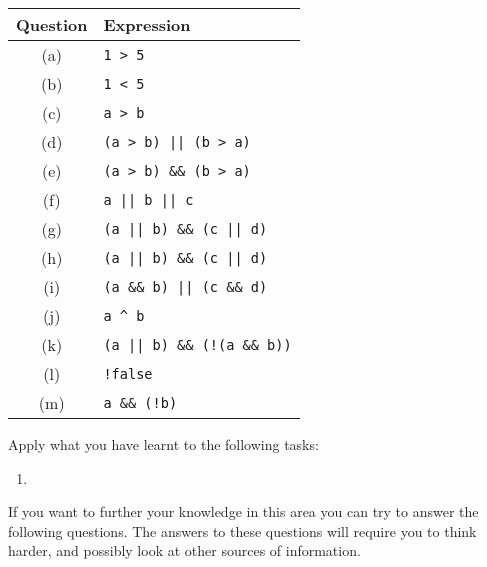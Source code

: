 \begin{enumerate}
{    \begin{tabular}{|c|l|}
      \hline
      \textbf{Question} & \textbf{Expression} \\
      \hline
      (a) & \texttt{1 > 5} \\
      \hline
      (b) & \texttt{1 < 5} \\
      \hline
      (c) & \texttt{a > b} \\
      \hline
      (d) & \texttt{(a > b) || (b > a)} \\
      \hline
      (e) & \texttt{(a > b) \&\& (b > a)} \\
      \hline
      (f) & \texttt{a || b || c} \\
      \hline
      (g) & \texttt{(a || b) \&\& (c || d)} \\
      \hline
      (h) & \texttt{(a || b) \&\& (c || d)} \\
      \hline
      (i) & \texttt{(a \&\& b) || (c \&\& d)} \\
      \hline
      (j) & \texttt{a \^{} b} \\
      \hline
      (k) & \texttt{(a || b) \&\& (!(a \&\& b))} \\
      \hline
      (l) & \texttt{!false} \\
      \hline
      (m) & \texttt{a \&\& (!b)}\\
      \hline
    \end{tabular}
  }
  
\end{enumerate}


Apply what you have learnt to the following tasks:
\begin{enumerate}
  \item 
\end{enumerate}

If you want to further your knowledge in this area you can try to answer the following questions. The answers to these questions will require you to think harder, and possibly look at other sources of information.
